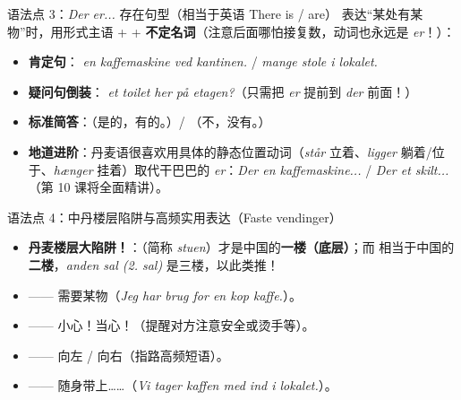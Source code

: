 \begin{grammatikbox}{语法点 3：\textit{Der er...} 存在句型（相当于英语 There is / are）}
表达“某处有某物”时，用形式主语  +  + \textbf{不定名词}（注意后面哪怕接复数，动词也永远是 \textit{er}！）：
\begin{itemize}
  \item \textbf{肯定句}：\textit{ en kaffemaskine ved kantinen.} / \textit{ mange stole i lokalet.}
  \item \textbf{疑问句倒装}：\textit{ et toilet her på etagen?}（只需把 \textit{er} 提前到 \textit{der} 前面！）
  \item \textbf{标准简答}：\textit{}（是的，有的。）/ \textit{}（不，没有。）
  \item \textbf{地道进阶}：丹麦语很喜欢用具体的静态位置动词（\textit{står} 立着、\textit{ligger} 躺着/位于、\textit{hænger} 挂着）取代干巴巴的 \textit{er}：\textit{Der  en kaffemaskine...} / \textit{Der  et skilt...}（第 10 课将全面精讲）。
\end{itemize}
\end{grammatikbox}

\begin{grammatikbox}{语法点 4：中丹楼层陷阱与高频实用表达（Faste vendinger）}
\begin{itemize}
  \item \textbf{丹麦楼层大陷阱！}：（简称 \textit{stuen}）才是中国的\textbf{一楼（底层）}；而  相当于中国的\textbf{二楼}，\textit{anden sal (2. sal)} 是三楼，以此类推！
  \item {} —— 需要某物（\textit{Jeg har brug for en kop kaffe.}）。
  \item {} —— 小心！当心！（提醒对方注意安全或烫手等）。
  \item {} —— 向左 / 向右（指路高频短语）。
  \item {} —— 随身带上……（\textit{Vi tager kaffen med ind i lokalet.}）。
\end{itemize}
\end{grammatikbox}


